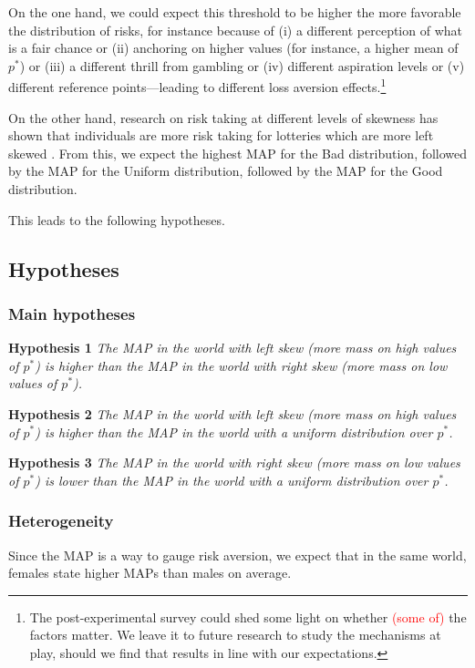 On the one hand, we could expect this threshold to be higher the more favorable the distribution of risks, for instance because of (i) a different perception of what is a fair chance or (ii) anchoring on higher values (for instance, a higher mean of $p^*$) or (iii) a different thrill from gambling or (iv) different aspiration levels or (v) different reference points---leading to different loss aversion effects.\footnote{
The post-experimental survey could shed some light on whether \textcolor{red}{(some of)} the factors matter.
We leave it to future research to study the mechanisms at play, should we find that results in line with our expectations.
}

On the other hand, research on risk taking at different levels of skewness has shown that individuals are more risk taking for lotteries which are more left skewed \citep{Bougherara2021}.
From this, we expect the highest MAP for the Bad distribution, followed by the MAP for the Uniform distribution, followed by the MAP for the Good distribution.


This leads to the following hypotheses.

\subsection{Hypotheses}
\subsubsection{Main hypotheses}
\noindent \textbf{Hypothesis 1} \quad \textit{The MAP in the world with left skew (more mass on high values of $p^*$) is higher than the MAP in the world with right skew (more mass on low values of $p^*$).}

\noindent \textbf{Hypothesis 2} \quad \textit{The MAP in the world with left skew (more mass on high values of $p^*$) is higher than the MAP in the world with a uniform distribution over $p^*$.}

\noindent \textbf{Hypothesis 3} \quad \textit{The MAP in the world with right skew (more mass on low values of $p^*$) is lower than the MAP in the world with a uniform distribution over $p^*$.}

\subsubsection{Heterogeneity}
Since the MAP is a way to gauge risk aversion, we expect that in the same world, females state higher MAPs than males on average.

